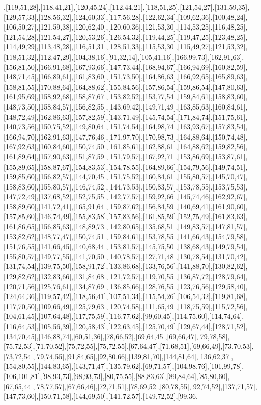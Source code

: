 ,[119,51,28],[118,41,21],[120,45,24],[112,44,21],[118,51,25],[121,54,27],[131,59,35],[129,57,33],[128,56,32],[124,60,33],[117,56,28],[122,62,34],[109,62,36],[100,48,24],[106,50,27],[121,59,38],[120,62,40],[120,60,36],[121,53,30],[114,53,25],[116,48,25],[121,54,28],[121,54,27],[120,53,26],[126,54,32],[119,44,25],[119,47,25],[123,48,25],[114,49,29],[113,48,28],[116,51,31],[128,51,33],[115,53,30],[115,49,27],[121,53,32],[118,51,32],[112,47,29],[104,38,16],[91,32,14],[105,41,16],[166,99,73],[162,91,63],[156,81,50],[166,91,68],[167,93,66],[147,73,44],[168,94,67],[166,94,69],[160,82,59],[148,71,45],[166,89,61],[161,83,60],[151,73,50],[164,86,63],[166,92,65],[165,89,63],[158,81,55],[170,88,64],[164,88,62],[155,84,56],[157,86,54],[159,86,54],[147,80,63],[161,95,69],[158,92,68],[158,87,67],[153,82,52],[153,77,54],[159,84,61],[158,83,60],[148,73,50],[158,84,57],[156,82,55],[143,69,42],[149,71,49],[163,85,63],[160,84,61],[148,72,49],[162,86,63],[157,82,59],[143,71,49],[145,74,54],[171,84,74],[151,75,61],[140,73,56],[150,75,52],[149,80,64],[151,74,54],[164,98,74],[163,93,67],[157,83,54],[166,94,70],[162,91,63],[147,76,46],[171,97,70],[170,98,73],[164,88,64],[150,74,48],[167,92,63],[160,84,60],[150,74,50],[161,85,61],[162,88,61],[164,88,62],[159,82,56],[161,89,64],[157,90,63],[151,87,59],[151,79,57],[167,92,71],[153,86,69],[153,87,61],[155,89,65],[158,87,67],[154,83,53],[154,78,55],[164,89,66],[154,79,56],[149,74,51],[159,85,60],[156,82,57],[144,70,45],[151,75,52],[160,84,61],[155,80,57],[145,70,47],[158,83,60],[155,80,57],[146,74,52],[144,73,53],[150,83,57],[153,78,55],[153,75,53],[147,72,49],[137,68,52],[152,75,55],[142,77,57],[159,92,66],[145,74,46],[162,92,67],[158,89,60],[141,72,41],[165,91,64],[159,87,62],[156,84,59],[140,69,41],[161,90,60],[157,85,60],[146,74,49],[155,83,58],[157,83,56],[161,85,59],[152,75,49],[161,83,63],[161,86,65],[156,85,63],[148,89,73],[142,80,65],[135,68,51],[149,83,57],[147,81,57],[153,82,62],[148,77,47],[150,74,51],[159,84,61],[153,78,55],[141,66,43],[154,79,58],[151,76,55],[141,66,45],[140,68,44],[153,81,57],[145,75,50],[138,68,43],[149,79,54],[155,80,57],[149,77,55],[141,70,50],[140,78,57],[127,71,48],[130,78,54],[131,70,42],[131,74,54],[139,75,50],[158,91,72],[133,86,68],[133,76,56],[141,88,70],[130,82,62],[129,82,62],[132,83,66],[131,84,68],[121,72,57],[119,70,55],[136,87,72],[128,79,64],[120,71,56],[125,76,61],[134,87,69],[136,85,66],[128,76,55],[123,76,56],[129,58,40],[124,64,36],[119,57,42],[118,56,41],[107,51,34],[115,54,26],[106,54,32],[119,81,68],[117,70,50],[109,66,49],[125,79,63],[120,74,58],[111,65,49],[118,75,59],[115,72,56],[104,61,45],[107,64,48],[117,75,59],[116,77,62],[99,60,45],[114,75,60],[114,74,64],[116,64,53],[105,56,39],[120,58,43],[122,63,45],[125,70,49],[129,67,44],[128,71,52],[134,70,45],[146,88,74],[60,51,36],[78,66,52],[69,64,45],[69,66,47],[79,78,58],[75,72,53],[71,70,52],[75,72,55],[75,72,55],[67,64,47],[71,68,51],[69,66,49],[73,70,53],[73,72,54],[79,74,55],[91,84,65],[92,80,66],[139,81,70],[144,81,64],[136,62,37],[154,80,55],[144,83,65],[143,71,47],[135,79,62],[69,71,57],[104,98,76],[101,99,78],[106,101,81],[98,93,73],[98,93,73],[80,75,55],[88,83,63],[89,84,64],[85,80,60],[67,65,44],[78,77,57],[67,66,46],[72,71,51],[78,69,52],[80,78,55],[92,74,52],[137,71,57],[147,73,60],[150,71,58],[144,69,50],[141,72,57],[149,72,52],[99,36,